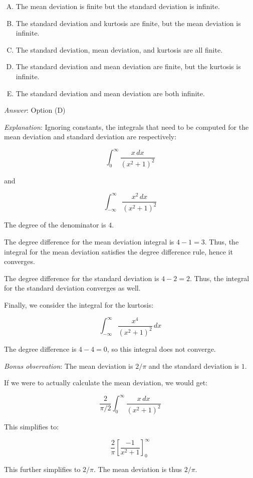 \documentclass[10pt]{amsart}
\begin{document}
\begin{enumerate}
  \begin{enumerate}[(A)]
  \item The mean deviation is finite but the standard deviation is infinite.
  \item The standard deviation and kurtosis are finite, but the mean deviation is infinite.
  \item The standard deviation, mean deviation, and kurtosis are all finite.
  \item The standard deviation and mean deviation are finite, but the kurtosis is infinite.
  \item The standard deviation and mean deviation are both infinite.
  \end{enumerate}

  {\em Answer}: Option (D)

  {\em Explanation}: Ignoring constants, the integrals that need to be
  computed for the mean deviation and standard deviation are
  respectively:

  $$\int_0^\infty \frac{x \, dx}{(x^2 + 1)^2}$$

  and

  $$\int_{-\infty}^\infty \frac{x^2 \, dx}{(x^2 + 1)^2}$$

  The degree of the denominator is $4$. 

  The degree difference for the mean deviation integral is $4 - 1 =
  3$. Thus, the integral for the mean deviation satisfies the degree
  difference rule, hence it converges.

  The degree difference for the standard deviation is $4 - 2 =
  2$. Thus, the integral for the standard deviation converges as well.

  Finally, we consider the integral for the kurtosis:

  $$\int_{-\infty}^\infty \frac{x^4}{(x^2 + 1)^2} \, dx$$

  The degree difference is $4 - 4 = 0$, so this integral does not
  converge.

  {\em Bonus observation}: The mean deviation is $2/\pi$ and the
  standard deviation is $1$.

  If we were to actually calculate the mean deviation, we would get:

  $$\frac{2}{\pi/2} \int_0^\infty \frac{x \, dx}{(x^2 + 1)^2}$$

  This simplifies to:

  $$\frac{2}{\pi}\left[\frac{-1}{x^2 + 1}\right]_0^\infty$$

  This further simplifies to $2/\pi$. The mean deviation is thus $2/\pi$.


\end{enumerate}
\end{document}
